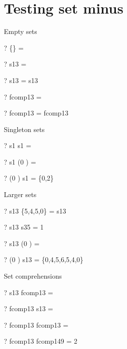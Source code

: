 \documentclass{article}
\begin{document}
\section{Testing set minus}
Empty sets
\begin{zed} \vdash?  \{\}      \setminus \emptyset   = \emptyset \end{zed}
\begin{zed} \vdash?  \emptyset \setminus s13         = \emptyset \end{zed}
\begin{zed} \vdash?  s13       \setminus \emptyset   = s13 \end{zed}
\begin{zed} \vdash?  \emptyset \setminus fcomp13     = \emptyset \end{zed}
\begin{zed} \vdash?  fcomp13   \setminus \emptyset   = fcomp13 \end{zed}
Singleton sets
\begin{zed} \vdash?  s1        \setminus s1          = \emptyset \end{zed}
\begin{zed} \vdash?  s1        \setminus (0 ) = \emptyset \end{zed}
\begin{zed} \vdash?  (0 ) \setminus s1        = \{0,2\} \end{zed}
Larger sets
\begin{zed} \vdash?  s13       \setminus \{5,4,5,0\} = s13 \end{zed}
\begin{zed} \vdash?  s13       \setminus s35         = 1  \end{zed}
\begin{zed} \vdash?  s13       \setminus (0 ) = \emptyset \end{zed}
\begin{zed} \vdash?  (0 ) \setminus s13 = \{0,4,5,6,5,4,0\}\end{zed}
Set comprehensions
\begin{zed} \vdash?  s13       \setminus fcomp13     = \emptyset \end{zed}
\begin{zed} \vdash?  fcomp13   \setminus s13         = \emptyset \end{zed}
\begin{zed} \vdash?  fcomp13   \setminus fcomp13     = \emptyset \end{zed}
\begin{zed} \vdash?  fcomp13   \setminus fcomp149    = 2  \end{zed}
\end{document}
